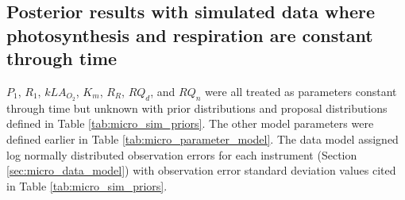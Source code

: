 \documentclass{ruthesis}
\begin{document}

%
%


\FloatBarrier
\subsection{Posterior results with simulated data where photosynthesis and respiration are constant through time}\label{sec:micro_sim_results1}

$P_1$, $R_1$, $kLA_{O_2}$, $K_m$, $R_R$, $RQ_d$, and $RQ_n$ were all treated as parameters constant through time but unknown with prior distributions and proposal distributions defined in Table \ref{tab:micro_sim_priors}. The other model parameters were defined earlier in Table \ref{tab:micro_parameter_model}.
The data model assigned log normally distributed observation errors for each instrument (Section \ref{sec:micro_data_model}) with observation error standard deviation values cited in Table \ref{tab:micro_sim_priors}.
\end{document}
